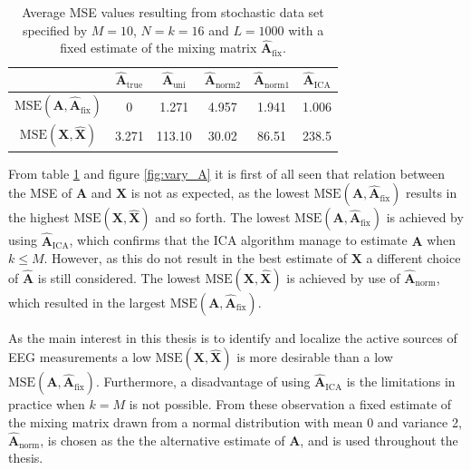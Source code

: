 \begin{table}[H]
\centering
\begin{tabular}{|c|c|c|c|c|c|}
\hline
 &  $\hat{\mathbf{A}}_{\text{true}}$ & $\hat{\mathbf{A}}_{\text{uni}}$ & $\hat{\mathbf{A}}_{\text{norm2}}$	 & $\hat{\mathbf{A}}_{\text{norm1}}$ & $\hat{\mathbf{A}}_{\text{ICA}}$ \\
\hline
$\text{MSE}(\mathbf{A}, \hat{\mathbf{A}}_{\text{fix}})$ & 0 & 1.271 & 4.957 & 1.941 & 1.006 \\
\hline
$\text{MSE}(\mathbf{X}, \hat{\mathbf{X}})$ & 3.271 & 113.10 & 30.02 & 86.51 & 238.5 \\
\hline
\end{tabular}
\caption{Average MSE values resulting from stochastic data set specified by $M=10$, $N=k=16$ and $L=1000$ with a fixed estimate of the mixing matrix $\hat{\mathbf{A}}_{\text{fix}}$.}
\label{tab:fixed}
\end{table}
\noindent
From table \ref{tab:fixed} and figure \ref{fig:vary_A} it is first of all seen that relation between the MSE of $\textbf{A}$ and $\textbf{X}$ is not as expected, as the lowest $\text{MSE}(\mathbf{A}, \hat{\mathbf{A}}_{\text{fix}})$ results in the highest $\text{MSE}(\mathbf{X}, \hat{\mathbf{X}})$ and so forth. 
The lowest $\text{MSE}(\mathbf{A}, \hat{\mathbf{A}}_{\text{fix}})$ is achieved by using $\hat{\mathbf{A}}_{\text{ICA}}$, which confirms that the ICA algorithm manage to estimate $\mathbf{A}$ when $k \leq M$. 
However, as this do not result in the best estimate of $\mathbf{X}$ a different choice of $\hat{\mathbf{A}}$ is still considered. 
The lowest $\text{MSE}(\mathbf{X}, \hat{\mathbf{X}})$ is achieved by use of $\hat{\mathbf{A}}_{\text{norm}}$, which resulted in the largest $\text{MSE}(\mathbf{A}, \hat{\mathbf{A}}_{\text{fix}})$. 
      
As the main interest in this thesis is to identify and localize the active sources of EEG measurements a low $\text{MSE}(\mathbf{X}, \hat{\mathbf{X}})$ is more desirable than a low $\text{MSE}(\mathbf{A}, \hat{\mathbf{A}}_{\text{fix}})$. 
Furthermore, a disadvantage of using $\hat{\mathbf{A}}_{\text{ICA}}$ is the limitations in practice when $k = M$ is not possible.     
From these observation a fixed estimate of the mixing matrix drawn from a normal distribution with mean 0 and variance 2, $\hat{\mathbf{A}}_{\text{norm}}$, is chosen as the the alternative estimate of $\mathbf{A}$, and is used throughout the thesis. 

